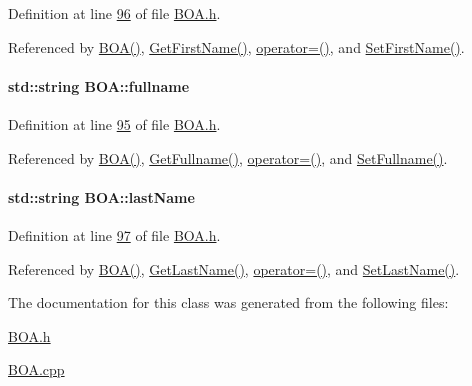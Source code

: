 Definition at line \hyperlink{_b_o_a_8h_source_l00096}{96} of file \hyperlink{_b_o_a_8h_source}{B\+O\+A.\+h}.



Referenced by \hyperlink{_b_o_a_8h_source_l00024}{B\+O\+A()}, \hyperlink{_b_o_a_8cpp_source_l00090}{Get\+First\+Name()}, \hyperlink{_b_o_a_8h_source_l00064}{operator=()}, and \hyperlink{_b_o_a_8cpp_source_l00086}{Set\+First\+Name()}.

\paragraph[{\texorpdfstring{fullname}{fullname}}]{\setlength{\rightskip}{0pt plus 5cm}std\+::string B\+O\+A\+::fullname\hspace{0.3cm}{\ttfamily [private]}}\hypertarget{class_b_o_a_aed3225e383c08b1b7c962a0e43b180d1_aed3225e383c08b1b7c962a0e43b180d1}{}\label{class_b_o_a_aed3225e383c08b1b7c962a0e43b180d1_aed3225e383c08b1b7c962a0e43b180d1}


Definition at line \hyperlink{_b_o_a_8h_source_l00095}{95} of file \hyperlink{_b_o_a_8h_source}{B\+O\+A.\+h}.



Referenced by \hyperlink{_b_o_a_8h_source_l00024}{B\+O\+A()}, \hyperlink{_b_o_a_8cpp_source_l00098}{Get\+Fullname()}, \hyperlink{_b_o_a_8h_source_l00064}{operator=()}, and \hyperlink{_b_o_a_8cpp_source_l00094}{Set\+Fullname()}.

\paragraph[{\texorpdfstring{last\+Name}{lastName}}]{\setlength{\rightskip}{0pt plus 5cm}std\+::string B\+O\+A\+::last\+Name\hspace{0.3cm}{\ttfamily [private]}}\hypertarget{class_b_o_a_ab7749e6e945beaca57a3ef01259c6fea_ab7749e6e945beaca57a3ef01259c6fea}{}\label{class_b_o_a_ab7749e6e945beaca57a3ef01259c6fea_ab7749e6e945beaca57a3ef01259c6fea}


Definition at line \hyperlink{_b_o_a_8h_source_l00097}{97} of file \hyperlink{_b_o_a_8h_source}{B\+O\+A.\+h}.



Referenced by \hyperlink{_b_o_a_8h_source_l00024}{B\+O\+A()}, \hyperlink{_b_o_a_8cpp_source_l00082}{Get\+Last\+Name()}, \hyperlink{_b_o_a_8h_source_l00064}{operator=()}, and \hyperlink{_b_o_a_8cpp_source_l00078}{Set\+Last\+Name()}.



The documentation for this class was generated from the following files\+:\begin{DoxyCompactItemize}
\item 
\hyperlink{_b_o_a_8h}{B\+O\+A.\+h}\item 
\hyperlink{_b_o_a_8cpp}{B\+O\+A.\+cpp}\end{DoxyCompactItemize}
